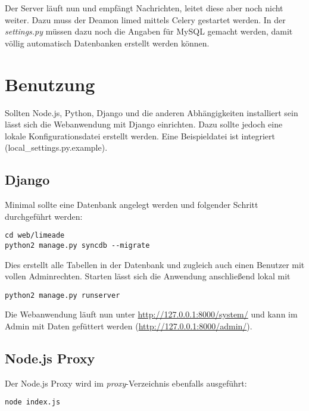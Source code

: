 \documentclass[letterpaper,10pt,english]{sphinxmanual}
\begin{document}
Der Server läuft nun und empfängt Nachrichten, leitet diese aber noch nicht
weiter. Dazu muss der Deamon limed mittels Celery gestartet werden. In der
\emph{settings.py} müssen dazu noch die Angaben für MySQL gemacht werden, damit
völlig automatisch Datenbanken erstellt werden können.


\section{Benutzung}
\label{getting-started/using::doc}\label{getting-started/using:benutzung}
Sollten Node.js, Python, Django und die anderen Abhängigkeiten installiert sein
lässt sich die Webanwendung mit Django einrichten. Dazu sollte jedoch eine
lokale Konfigurationsdatei erstellt werden. Eine Beispieldatei ist integriert
(local\_settings.py.example).


\subsection{Django}
\label{getting-started/using:django}
Minimal sollte eine Datenbank angelegt werden und folgender Schritt durchgeführt
werden:
\begin{Verbatim}[commandchars=\\\{\}]
cd web/limeade
python2 manage.py syncdb --migrate
\end{Verbatim}

Dies erstellt alle Tabellen in der Datenbank und zugleich auch einen Benutzer
mit vollen Adminrechten. Starten lässt sich die Anwendung anschließend lokal mit

\begin{Verbatim}[commandchars=\\\{\}]
python2 manage.py runserver
\end{Verbatim}

Die Webanwendung läuft nun unter \href{http://127.0.0.1:8000/system/}{http://127.0.0.1:8000/system/} und kann im Admin
mit Daten gefüttert werden (\href{http://127.0.0.1:8000/admin/}{http://127.0.0.1:8000/admin/}).


\subsection{Node.js Proxy}
\label{getting-started/using:id2}\label{getting-started/using:node-js-proxy}
Der Node.js Proxy wird im \emph{proxy}-Verzeichnis ebenfalls ausgeführt:

\begin{Verbatim}[commandchars=\\\{\}]
node index.js
\end{Verbatim}
\end{document}
